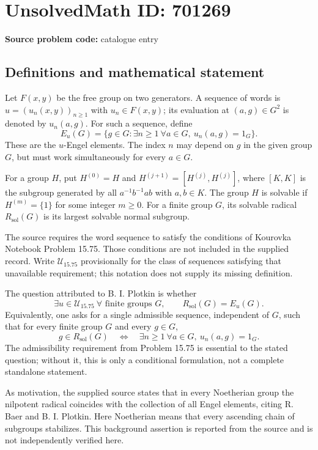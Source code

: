 \documentclass[11pt]{article}
\begin{document}
\section*{UnsolvedMath ID: 701269}
\textbf{Source problem code:} catalogue entry
\subsection{Definitions and mathematical statement}
Let \(F(x,y)\) be the free group on two generators. A sequence of words is \(u=(u_n(x,y))_{n\geq 1}\) with \(u_n\in F(x,y)\); its evaluation at \((a,g)\in G^2\) is denoted by \(u_n(a,g)\). For such a sequence, define
\[
E_u(G)=\{g\in G:\exists n\geq 1\ \forall a\in G,\ u_n(a,g)=1_G\}.
\]
These are the \(u\)-Engel elements. The index \(n\) may depend on \(g\) in the given group \(G\), but must work simultaneously for every \(a\in G\).

For a group \(H\), put \(H^{(0)}=H\) and \(H^{(j+1)}=[H^{(j)},H^{(j)}]\), where \([K,K]\) is the subgroup generated by all \(a^{-1}b^{-1}ab\) with \(a,b\in K\). The group \(H\) is solvable if \(H^{(m)}=\{1\}\) for some integer \(m\geq 0\). For a finite group \(G\), its solvable radical \(R_{\mathrm{sol}}(G)\) is its largest solvable normal subgroup.

The source requires the word sequence to satisfy the conditions of Kourovka Notebook Problem 15.75. Those conditions are not included in the supplied record. Write \(\mathcal U_{15.75}\) provisionally for the class of sequences satisfying that unavailable requirement; this notation does not supply its missing definition.

The question attributed to B. I. Plotkin is whether
\[
\exists u\in\mathcal U_{15.75}\ \forall\text{ finite groups }G,
\qquad R_{\mathrm{sol}}(G)=E_u(G).
\]
Equivalently, one asks for a single admissible sequence, independent of \(G\), such that for every finite group \(G\) and every \(g\in G\),
\[
g\in R_{\mathrm{sol}}(G)
\quad\Longleftrightarrow\quad
\exists n\geq 1\ \forall a\in G,\ u_n(a,g)=1_G.
\]
The admissibility requirement from Problem 15.75 is essential to the stated question; without it, this is only a conditional formulation, not a complete standalone statement.

As motivation, the supplied source states that in every Noetherian group the nilpotent radical coincides with the collection of all Engel elements, citing R. Baer and B. I. Plotkin. Here Noetherian means that every ascending chain of subgroups stabilizes. This background assertion is reported from the source and is not independently verified here.
\end{document}

